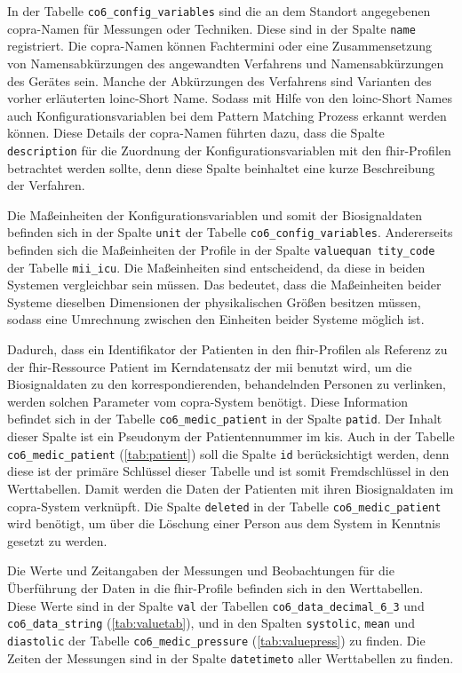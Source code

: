 In der Tabelle \texttt{co6\_config\_variables} sind die an dem Standort angegebenen \ac{copra}-Namen für Messungen oder Techniken. Diese sind in der Spalte \texttt{name} registriert. Die \ac{copra}-Namen können Fachtermini oder eine Zusammensetzung von Namensabkürzungen des angewandten Verfahrens und Namensabkürzungen des Gerätes sein. Manche der Abkürzungen des Verfahrens sind Varianten des vorher erläuterten \ac{loinc}-\glqq Short Name\grqq{}. Sodass mit Hilfe von den \ac{loinc}-\glqq Short Names\grqq{} auch Konfigurationsvariablen bei dem Pattern Matching Prozess erkannt werden können. Diese Details der \ac{copra}-Namen führten dazu, dass die Spalte \texttt{description} für die Zuordnung der Konfigurationsvariablen mit den \ac{fhir}-Profilen betrachtet werden sollte, denn diese Spalte beinhaltet eine kurze Beschreibung der Verfahren.

Die Maßeinheiten der Konfigurationsvariablen und somit der Biosignaldaten befinden sich in der Spalte \texttt{unit} der Tabelle \texttt{co6\_config\_variables}. Andererseits befinden sich die Maßeinheiten der Profile in der Spalte \texttt{valuequan tity\_code} der Tabelle \texttt{mii\_icu}. Die Maßeinheiten sind entscheidend, da diese in beiden Systemen vergleichbar sein müssen. Das bedeutet, dass die Maßeinheiten beider Systeme dieselben Dimensionen der physikalischen Größen besitzen müssen, sodass eine Umrechnung zwischen den Einheiten beider Systeme möglich ist.

Dadurch, dass ein Identifikator der Patienten in den \ac{fhir}-Profilen als Referenz zu der \ac{fhir}-Ressource \glqq Patient\grqq{} im Kerndatensatz der \ac{mii} benutzt wird, um die Biosignaldaten zu den korrespondierenden, behandelnden Personen zu verlinken, werden solchen Parameter vom \ac{copra}-System benötigt. Diese Information befindet sich in der Tabelle \texttt{co6\_medic\_patient} in der Spalte \texttt{patid}. Der Inhalt dieser Spalte ist ein Pseudonym der Patientennummer im \ac{kis}. Auch in der Tabelle \texttt{co6\_medic\_patient} (\ref{tab:patient}) soll  die Spalte \texttt{id} berücksichtigt werden, denn diese ist der primäre Schlüssel dieser Tabelle und ist somit Fremdschlüssel in den Werttabellen. Damit werden die Daten der Patienten mit ihren Biosignaldaten im \ac{copra}-System verknüpft. Die Spalte \texttt{deleted} in der Tabelle \texttt{co6\_medic\_patient} wird benötigt, um über die Löschung einer Person aus dem System in Kenntnis gesetzt zu werden.

Die Werte und Zeitangaben der Messungen und Beobachtungen für die Überführung der Daten in die \ac{fhir}-Profile befinden sich in den Werttabellen. Diese Werte sind in der Spalte \texttt{val} der Tabellen \texttt{co6\_data\_decimal\_6\_3} und \texttt{co6\_data\_string} (\ref{tab:valuetab}), und in den Spalten \texttt{systolic}, \texttt{mean} und \texttt{diastolic} der Tabelle \texttt{co6\_medic\_pressure} (\ref{tab:valuepress}) zu finden. Die Zeiten der Messungen sind in der Spalte \texttt{datetimeto} aller Werttabellen zu finden.

